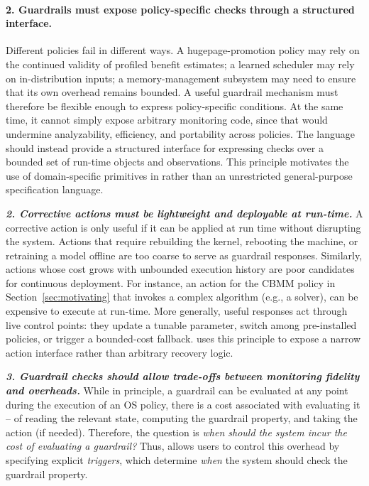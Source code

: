 \paragraph{2. Guardrails must expose policy-specific checks through a structured interface.}
Different policies fail in different ways. A hugepage-promotion policy may rely on the continued validity of profiled benefit estimates; a learned scheduler may rely on in-distribution inputs; a memory-management subsystem may need to ensure that its own overhead remains bounded. A useful guardrail mechanism must therefore be flexible enough to express policy-specific conditions. At the same time, it cannot simply expose arbitrary monitoring code, since that would undermine analyzability, efficiency, and portability across policies. The language should instead provide a structured interface for expressing checks over a bounded set of run-time objects and observations. This principle motivates the use of domain-specific primitives in \lang rather than an unrestricted general-purpose specification language.
\fi

\medskip\noindent
{\it \textbf{2. Corrective actions must be lightweight and deployable at run-time.}}
A corrective action is only useful if it can be applied at run time without disrupting the system. Actions that require rebuilding the kernel, rebooting the machine, or retraining a model offline are too coarse to serve as guardrail responses.
Similarly, actions whose cost grows with unbounded execution history are poor candidates for continuous deployment. For instance, an action for the CBMM policy in Section~\ref{sec:motivating} %
that invokes a complex algorithm (e.g., a solver), can be expensive to execute at run-time.
More generally, useful responses act through live control points: they update a tunable parameter, switch among pre-installed policies, or trigger a bounded-cost fallback. \lang uses this principle to expose a narrow action interface rather than arbitrary recovery logic.

\medskip\noindent
{\it \textbf{3. Guardrail checks should allow trade-offs between monitoring fidelity and overheads.}}
While in principle, a guardrail can be evaluated at any point during the execution of an OS policy, there is a cost associated with evaluating it -- of reading the relevant state, computing the guardrail property, and taking the action (if needed).
Therefore, the question is {\it when should the system incur the cost of evaluating a guardrail?}
Thus, \lang allows users to control this overhead by specifying explicit {\em triggers}, which determine \emph{when} the system should check the guardrail property.

